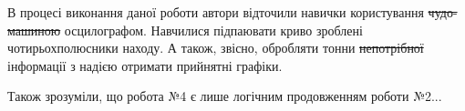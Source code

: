 
В процесі виконання даної роботи автори відточили навички користування \sout{чудо-машиною} осцилографом. Навчилися підпаювати криво зроблені чотирьохполюсники находу. А також, звісно, обробляти тонни \sout{непотрібної} інформації з надією отримати прийнятні графіки. 

Також зрозуміли, що робота №4 є лише логічним продовженням роботи №2...